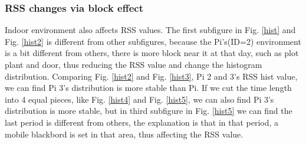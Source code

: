 \documentclass[10pt,conference]{IEEEtran}
\begin{document}
\subsubsection{RSS changes via block effect}
Indoor environment also affects RSS values. The first subfigure in Fig. \ref{hist} and Fig. \ref{hist2} is different from other subfigures, because the Pi's(ID=2) environment is a bit different from others, there is more block near it at that day, such as plot plant and door, thus reducing the RSS value and change the histogram distribution.
Comparing Fig. \ref{hist2} and Fig. \ref{hist3}, Pi 2 and 3's RSS hist value, we can find Pi 3's distribution is more stable than Pi. If we cut the time length into 4 equal pieces, like Fig. \ref{hist4} and Fig. \ref{hist5}, we can also find Pi 3's distribution is more stable, but in third subfigure in Fig. \ref{hist5} we can find the last period is different from others, the explanation is that in that period, a mobile blackbord is set in that area, thus affecting the RSS value.
\end{document}
